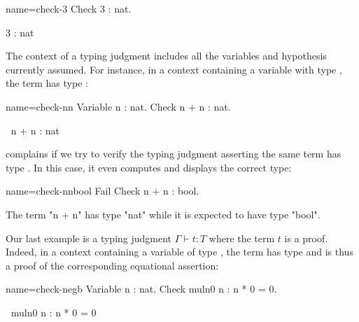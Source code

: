 \begin{coq-left}{name=check-3}{}
Check 3 : nat.
\end{coq-left}
\begin{coqout-right}
3 : nat
\end{coqout-right}

The context of a typing judgment includes all the variables and
hypothesis currently assumed. %
For instance, in a context containing a variable  with
type , the term  has type :

\begin{coq-left}{name=check-nn}{}
Variable n : nat.
Check n + n : nat.
\end{coq-left}
\begin{coqout-right}
$~$
n + n : nat
\end{coqout-right}

\Coq{} complains if we try to verify the typing judgment asserting the
same term has type . In this case, it even computes and displays the
correct type:

\begin{coq-left}{name=check-nnbool}{}
Fail Check n + n : bool.
$~$
\end{coq-left}
\begin{coqout-right}
The term "n + n" has type "nat" while it is expected to have type "bool".
\end{coqout-right}

Our last example is a typing judgment  $\Gamma \vdash t : T$ where
the term $t$ is a proof. Indeed, in a context containing a
variable  of type , the term
 has type  and is thus a proof of the
corresponding equational assertion:

\begin{coq-left}{name=check-negb}{}
Variable n : nat.
Check muln0 n : n * 0 = 0.
\end{coq-left}
\begin{coqout-right}
$~$
muln0 n : n * 0 = 0
\end{coqout-right}

% 


